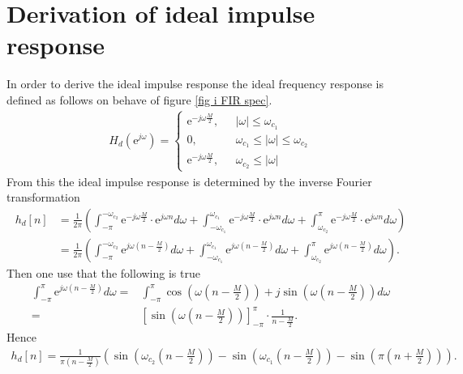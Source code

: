 \chapter{Derivation of ideal impulse response}\label{appC}
In order to derive the ideal impulse response the ideal frequency response is defined as follows on behave of figure \ref{fig i FIR spec}.
\begin{align*}
 H_d(\text{e}^{j\omega})= \begin{cases}
  \text{e}^{-j\omega\frac{M}{2}}, \ \ \ & |\omega| \leq\omega_{c_1} \\
 0, \ \ \ & \omega_{c_1} \leq |\omega| \leq \omega_{c_2} \\
  \text{e}^{-j\omega\frac{M}{2}}, \ \ \ & \omega_{c_2} \leq |\omega| 
\end{cases}
\end{align*}
From this the ideal impulse response is determined by the inverse Fourier transformation 
\begin{align*}
h_d[n] &= \frac{1}{2\pi} \left(  \int_{-\pi}^{-\omega_{c_2}} \text{e}^{-j\omega \frac{M}{2}} \cdot \text{e}^{j \omega n} d\omega + \int_{-\omega_{c_1}}^{\omega_{c_1}} \text{e}^{-j\omega \frac{M}{2}} \cdot \text{e}^{j \omega n} d\omega +\int_{\omega_{c_2}}^{\pi} \text{e}^{-j\omega \frac{M}{2}} \cdot \text{e}^{j \omega n} d\omega	\right) \\
&= \frac{1}{2\pi} \left(  \int_{-\pi}^{-\omega_{c_2}} \text{e}^{j\omega \left(n- \frac{M}{2} \right) } d\omega + \int_{-\omega_{c_1}}^{\omega_{c_1}} \text{e}^{j\omega \left(n- \frac{M}{2} \right) }  d\omega + \int_{\omega_{c_2}}^{\pi} \text{e}^{j\omega \left( n-\frac{M}{2} \right) } d\omega	\right).
\end{align*}
Then one use that the following is true
\begin{align*}
\int_{-\pi}^{\pi} \text{e}^{j\omega \left(n- \frac{M}{2} \right) }  d\omega =& \int_{-\pi}^{\pi} \cos\left( \omega \left(n-\frac{M}{2}\right)\right)+j \sin \left( \omega \left(n-\frac{M}{2}\right) \right) d\omega \\
=& \left[ \sin\left(\omega \left(n-\frac{M}{2}\right)\right) \right]_{-\pi}^{\pi} \cdot \frac{1}{n- \frac{M}{2}}.
\end{align*}
Hence
\begin{align*}
h_d[n]= \frac{1}{\pi \left(n-\frac{M}{2}\right)} \left(\sin\left(\omega_{c_2} \left(n-\frac{M}{2}\right)\right) - \sin\left(\omega_{c_1} \left(n-\frac{M}{2}\right)\right) - \sin\left( \pi\left( n + \frac{M}{2} \right) \right) \right).
\end{align*}
